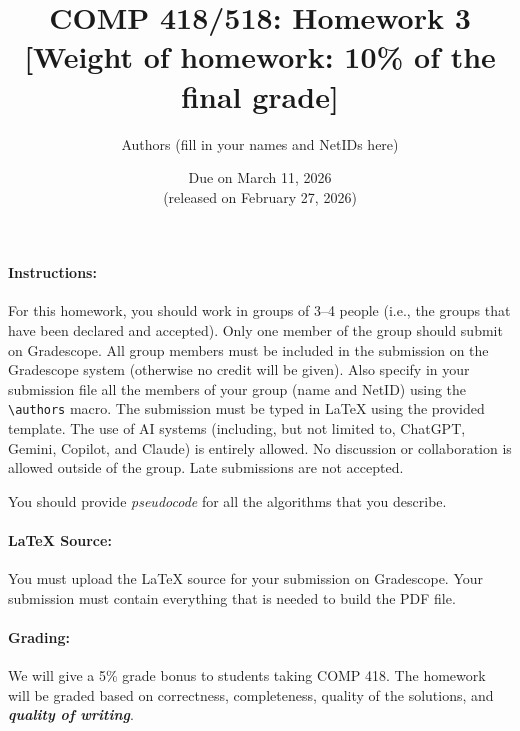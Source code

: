 \documentclass[11pt]{article}
\begin{document}
\title{COMP 418/518: Homework 3 \\[1ex] \large [Weight of homework: 10\% of the final grade]}
\author{Authors (fill in your names and NetIDs here)}
\date{Due on March 11, 2026 \\ \small (released on February 27, 2026)}

\maketitle

\paragraph{Instructions:}

For this homework, you should work in groups of 3--4 people (i.e., the groups that have been declared and accepted).
%
Only one member of the group should submit on Gradescope.
%
All group members must be included in the submission on the Gradescope system (otherwise no credit will be given).
%
Also specify in your submission file all the members of your group (name and NetID) using the \texttt{\textbackslash authors} macro.
%
The submission must be typed in LaTeX using the provided template.
%
The use of AI systems (including, but not limited to, ChatGPT, Gemini, Copilot, and Claude) is entirely allowed.
%
No discussion or collaboration is allowed outside of the group.
%
Late submissions are not accepted.

\begin{center}
You should provide \emph{pseudocode} for all the algorithms that you describe.
\end{center}

\paragraph{LaTeX Source:}

You must upload the LaTeX source for your submission on Gradescope. Your submission must contain everything that is needed to build the PDF file.

\paragraph{Grading:}

We will give a 5\% grade bonus to students taking COMP 418. The homework will be graded based on correctness, completeness, quality of the solutions, and \textbf{\em quality of writing}.
\end{document}
